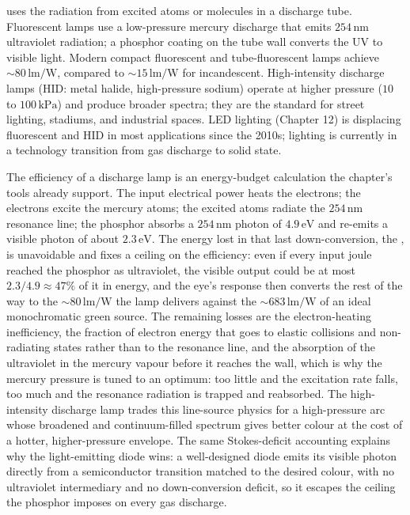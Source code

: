  uses the radiation from excited atoms or
molecules in a discharge tube. Fluorescent lamps use a low-pressure
mercury discharge that emits $254\,\si{\nano\meter}$ ultraviolet
radiation; a phosphor coating on the tube wall converts the UV to
visible light. Modern compact fluorescent and tube-fluorescent lamps
achieve $\sim 80\,\si{\lumen\per\watt}$, compared to $\sim 15\,\si{
\lumen\per\watt}$ for incandescent. High-intensity discharge lamps
(HID: metal halide, high-pressure sodium) operate at higher pressure
($10$ to $100\,\si{\kilo\pascal}$) and produce broader spectra; they
are the standard for street lighting, stadiums, and industrial
spaces. LED lighting (Chapter 12) is displacing fluorescent and HID
in most applications since the 2010s; lighting is currently in a
technology transition from gas discharge to solid state.

The efficiency of a discharge lamp is an energy-budget calculation the
chapter's tools already support. The input electrical power heats the
electrons; the electrons excite the mercury atoms; the excited atoms
radiate the $254\,\si{\nano\meter}$ resonance line; the phosphor absorbs a
$254\,\si{\nano\meter}$ photon of $4.9\,\si{\electronvolt}$ and re-emits a
visible photon of about $2.3\,\si{\electronvolt}$. The energy lost in that
last down-conversion, the , is unavoidable and
fixes a ceiling on the efficiency: even if every input joule reached the
phosphor as ultraviolet, the visible output could be at most $2.3/4.9
\approx 47\%$ of it in energy, and the eye's response then converts the
rest of the way to the $\sim 80\,\si{\lumen\per\watt}$ the lamp delivers
against the $\sim 683\,\si{\lumen\per\watt}$ of an ideal monochromatic
green source. The remaining losses are the electron-heating inefficiency,
the fraction of electron energy that goes to elastic collisions and
non-radiating states rather than to the resonance line, and the
absorption of the ultraviolet in the mercury vapour before it reaches the
wall, which is why the mercury pressure is tuned to an optimum: too little
and the excitation rate falls, too much and the resonance radiation is
trapped and reabsorbed. The high-intensity discharge lamp trades this
line-source physics for a high-pressure arc whose broadened and
continuum-filled spectrum gives better colour at the cost of a hotter,
higher-pressure envelope. The same Stokes-deficit accounting explains why
the light-emitting diode wins: a well-designed diode emits its visible
photon directly from a semiconductor transition matched to the desired
colour, with no ultraviolet intermediary and no down-conversion deficit,
so it escapes the ceiling the phosphor imposes on every gas discharge.

